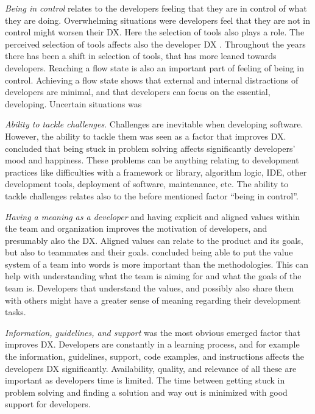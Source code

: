 \documentclass[english, 12pt, a4paper, sci, utf8, a-1b, online]{aaltothesis}
\begin{document}
\textit{Being in control} relates to the developers feeling that they are in control of what they are doing. Overwhelming situations were developers feel that they are not in control might worsen their DX. Here the selection of tools also plays a role. The perceived selection of tools affects also the developer DX \parencite{software-developers-as-users}. Throughout the years there has been a shift in selection of tools, that has more leaned towards developers. Reaching a flow state is also an important part of feeling of being in control. Achieving a flow state shows that external and internal distractions of developers are minimal, and that developers can focus on the essential, developing. Uncertain situations was

\textit{Ability to tackle challenges}. Challenges are inevitable when developing software. However, the ability to tackle them was seen as a factor that improves DX. \textcite{what-happens-when-unhappy} concluded that being stuck in problem solving affects significantly developers' mood and happiness. These problems can be anything relating to development practices like difficulties with a framework or library, algorithm logic, IDE, other development tools, deployment of software, maintenance, etc. The ability to tackle challenges relates also to the before mentioned factor ``being in control''.

\textit{Having a meaning as a developer} and having explicit and aligned values within the team and organization improves the motivation of developers, and presumably also the DX. Aligned values can relate to the product and its goals, but also to teammates and their goals. \textcite{fagerholm2014examining} concluded being able to put the value system of a team into words is more important than the methodologies. This can help with understanding what the team is aiming for and what the goals of the team is. Developers that understand the values, and possibly also share them with others might have a greater sense of meaning regarding their development tasks.

\textit{Information, guidelines, and support} was the most obvious emerged factor that improves DX. Developers are constantly in a learning process, and for example the information, guidelines, support, code examples, and instructions affects the developers DX significantly. Availability, quality, and relevance of all these are important as developers time is limited. The time between getting stuck in problem solving and finding a solution and way out is minimized with good support for developers.
\end{document}

